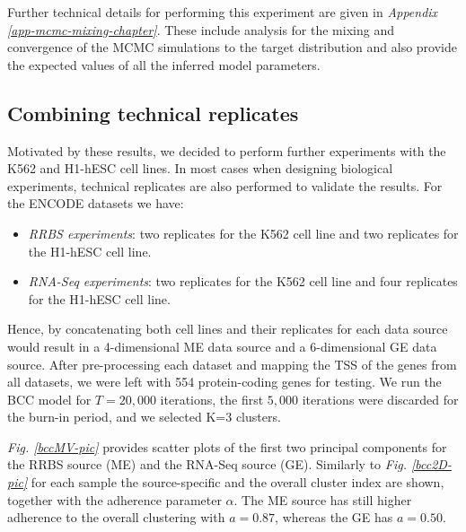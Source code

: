 Further technical details for performing this experiment are given in \emph{Appendix \ref{app-mcmc-mixing-chapter}}. These include analysis for the mixing and convergence of the MCMC simulations to the target distribution and also provide the expected values of all the inferred model parameters.

\subsection*{Combining technical replicates}
Motivated by these results, we decided to perform further experiments with the K562 and H1-hESC cell lines. In most cases when designing biological experiments, technical replicates are also performed to validate the results. For the ENCODE datasets we have:
\begin{itemize}
	\item \emph{RRBS experiments}: two replicates for the K562 cell line and two replicates for the H1-hESC cell line.
	\item \emph{RNA-Seq experiments}: two replicates for the K562 cell line and four replicates for the H1-hESC cell line.
\end{itemize}

Hence, by concatenating both cell lines and their replicates for each data source would result in a 4-dimensional ME data source and a 6-dimensional GE data source.  After pre-processing each dataset and mapping the TSS of the genes from all datasets, we were left with 554 protein-coding genes for testing. We run the BCC model for $T=20,000$ iterations, the first $5,000$ iterations were discarded for the burn-in period, and we selected K=3 clusters. 

\emph{Fig. \ref{bccMV-pic}} provides scatter plots of the first two principal components for the RRBS source (ME) and the RNA-Seq source (GE). Similarly to \emph{Fig. \ref{bcc2D-pic}} for each sample the source-specific and the overall cluster index are shown, together with the adherence parameter $\alpha$. The ME source has still higher adherence to the overall clustering with $a=0.87$, whereas the GE has $a=0.50$. 

